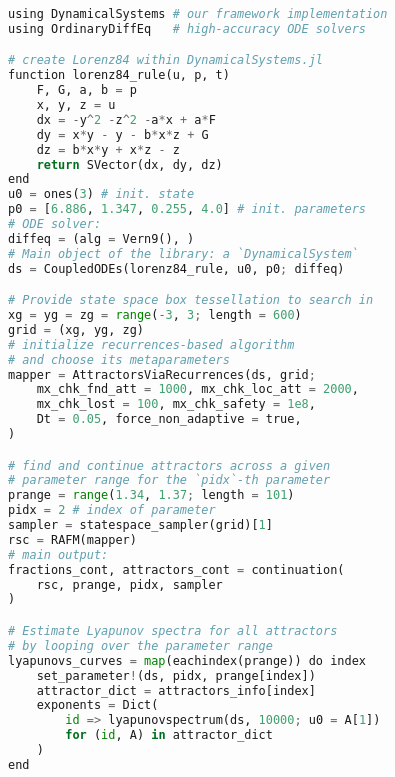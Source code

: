 \documentclass[%
 aip,
 amsmath,amssymb,
 reprint,%
]{revtex4-1}
\begin{document}
\begin{lstlisting}[language=Python, label = {lst:code},basicstyle=\scriptsize\ttfamily, caption = {Julia code snippet showcasing the usage of the DynamicalSystems.jl implementation of our framework. The code produces panel (a) of Fig. 2. The main output of the code are two vectors, containing the basins fractions and attractors at each parameter value respectively. The fractions and attractors are formulated as dictionaries, mapping attractor labels (the integers) to basin fractions and sets of points on the attractor, respectively. At its end, the code snippet computes the Lyapunov spectra of all found attractors, by using the first point on each attractor as initial condition for the computation of the Lyapunov spectrum.}]
using DynamicalSystems # our framework implementation
using OrdinaryDiffEq   # high-accuracy ODE solvers

# create Lorenz84 within DynamicalSystems.jl
function lorenz84_rule(u, p, t)
    F, G, a, b = p
    x, y, z = u
    dx = -y^2 -z^2 -a*x + a*F
    dy = x*y - y - b*x*z + G
    dz = b*x*y + x*z - z
    return SVector(dx, dy, dz)
end
u0 = ones(3) # init. state
p0 = [6.886, 1.347, 0.255, 4.0] # init. parameters
# ODE solver:
diffeq = (alg = Vern9(), )
# Main object of the library: a `DynamicalSystem`
ds = CoupledODEs(lorenz84_rule, u0, p0; diffeq)

# Provide state space box tessellation to search in
xg = yg = zg = range(-3, 3; length = 600)
grid = (xg, yg, zg)
# initialize recurrences-based algorithm
# and choose its metaparameters
mapper = AttractorsViaRecurrences(ds, grid;
    mx_chk_fnd_att = 1000, mx_chk_loc_att = 2000,
    mx_chk_lost = 100, mx_chk_safety = 1e8,
    Dt = 0.05, force_non_adaptive = true,
)

# find and continue attractors across a given
# parameter range for the `pidx`-th parameter
prange = range(1.34, 1.37; length = 101)
pidx = 2 # index of parameter
sampler = statespace_sampler(grid)[1]
rsc = RAFM(mapper)
# main output:
fractions_cont, attractors_cont = continuation(
    rsc, prange, pidx, sampler
)

# Estimate Lyapunov spectra for all attractors
# by looping over the parameter range
lyapunovs_curves = map(eachindex(prange)) do index
    set_parameter!(ds, pidx, prange[index])
    attractor_dict = attractors_info[index]
    exponents = Dict(
        id => lyapunovspectrum(ds, 10000; u0 = A[1])
        for (id, A) in attractor_dict
    )
end
\end{lstlisting}
\end{document}
